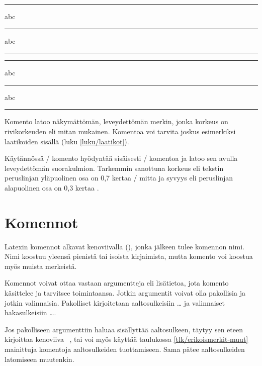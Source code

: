 \begin{koodilohkosis}
\rule{1ex}{1ex} abc \rule{3em}{.5bp} abc \rule[1ex]{3em}{.5bp}
\end{koodilohkosis}

\begin{tulossis}
  \rule{1ex}{1ex} abc \rule{3em}{.5bp} abc \rule[1ex]{3em}{.5bp}
\end{tulossis}

\noindent
Komento  latoo näkymättömän, leveydettömän merkin, jonka
korkeus on rivikorkeuden eli mitan  mukainen.
Komentoa voi tarvita joskus esimerkiksi laatikoiden sisällä (luku
\ref{luku/laatikot}).

Käytännössä \-/ komento hyödyntää sisäisesti
\-/ komentoa ja latoo sen avulla leveydettömän
suorakulmion. Tarkemmin sanottuna korkeus eli tekstin peruslinjan
yläpuolinen osa on 0,7 kertaa \-/ mitta ja syvyys
eli peruslinjan alapuolinen osa on 0,3 kertaa .

\begin{koodilohkosis}
\rule[-0.3\baselineskip]{0bp}{\baselineskip}
\end{koodilohkosis}

\section{Komennot}
\label{luku/komennot}

Latexin komennot alkavat kenoviivalla (\koodi{\textbackslash}), jonka
jälkeen tulee komennon nimi. Nimi koostuu yleensä pienistä tai isoista
kirjaimista, mutta komento voi koostua myös muista merkeistä.

Komennot voivat ottaa vastaan argumentteja eli lisätietoa, jota komento
käsittelee ja tarvitsee toimintaansa. Jotkin argumentit voivat olla
pakollisia ja jotkin valinnaisia. Pakolliset kirjoitetaan
aaltosulkeisiin \koodi{\{}\ldots\koodi{\}} ja valinnaiset hakasulkeisiin
\koodi{[}\ldots\koodi{]}.

\begin{koodilohkosis}
\komento
{}
\end{koodilohkosis}

\noindent
Jos pakolliseen argumenttiin haluaa sisällyttää aaltosulkeen, täytyy sen
eteen kirjoittaa kenoviiva \komento{\{}~\komento{\}}, tai voi myös
käyttää taulukossa \ref{tlk/erikoismerkit-muut} mainittuja komentoja
aaltosulkeiden tuottamiseen. Sama pätee aaltosulkeiden latomiseen
muutenkin.

